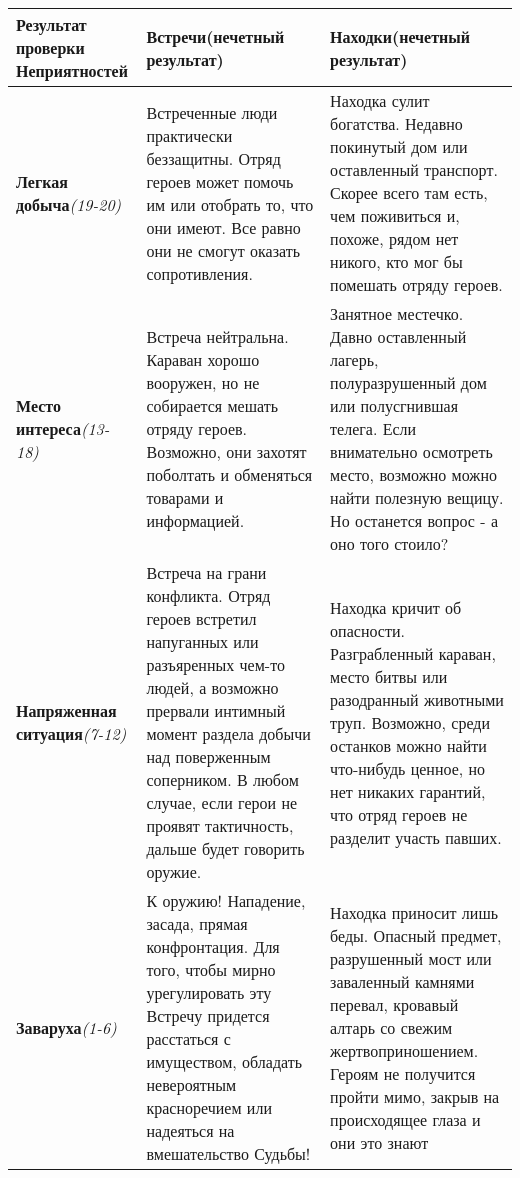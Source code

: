 \begin{center}
\begin{tabular}{|p{3cm}|p{6.5cm}|p{6.5cm}|}
\hline
\textbf{Результат проверки Неприятностей} & \textbf{Встречи(нечетный результат)} & \textbf{Находки(нечетный результат)}
\\ \hline
\textbf{Легкая добыча}\newline\textit{(19-20)} & Встреченные люди практически беззащитны. Отряд героев может помочь им или отобрать то, что они имеют. Все равно они не смогут оказать сопротивления. & Находка сулит богатства. Недавно покинутый дом или оставленный транспорт. Скорее всего там есть, чем поживиться и, похоже, рядом нет никого, кто мог бы помешать отряду героев.
\\ \hline
\textbf{Место интереса}\newline\textit{(13-18)} & Встреча нейтральна. Караван хорошо вооружен, но не собирается мешать отряду героев. Возможно, они захотят поболтать и обменяться товарами и информацией. & Занятное местечко. Давно оставленный лагерь, полуразрушенный дом или полусгнившая телега. Если внимательно осмотреть место, возможно можно найти полезную вещицу. Но останется вопрос - а оно того стоило?
\\ \hline
\textbf{Напряженная ситуация}\newline\textit{(7-12)} & Встреча на грани конфликта. Отряд героев встретил напуганных или разъяренных чем-то людей, а возможно прервали интимный момент раздела добычи над поверженным соперником. В любом случае, если герои не проявят тактичность, дальше будет говорить оружие. & Находка кричит об опасности. Разграбленный караван, место битвы или разодранный животными труп. Возможно, среди останков можно найти что-нибудь ценное, но нет никаких гарантий, что отряд героев не разделит участь павших.
\\ \hline
\textbf{Заваруха}\newline\textit{(1-6)} & К оружию! Нападение, засада, прямая конфронтация. Для того, чтобы мирно урегулировать эту Встречу придется расстаться с имуществом, обладать невероятным красноречием или надеяться на вмешательство Судьбы! & Находка приносит лишь беды. Опасный предмет, разрушенный мост или заваленный камнями перевал, кровавый алтарь со свежим жертвоприношением. Героям не получится пройти мимо, закрыв на происходящее глаза и они это знают
\\ \hline
\end{tabular}
\end{center}

